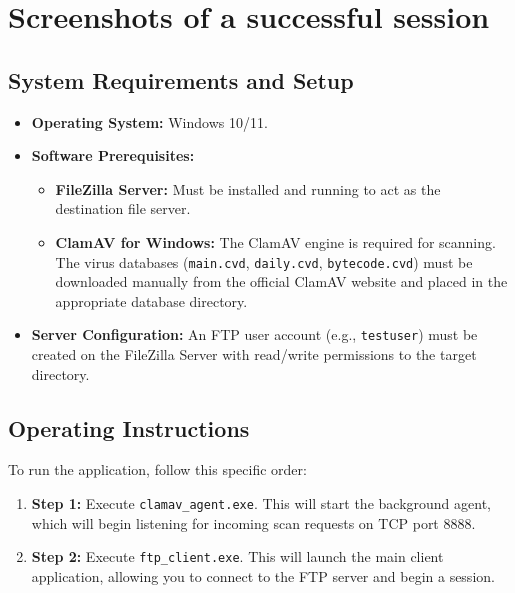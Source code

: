 \section{Screenshots of a successful session}
\subsection{System Requirements and Setup}
\begin{itemize}
    \item \textbf{Operating System:} Windows 10/11.
    \item \textbf{Software Prerequisites:}
    \begin{itemize}
        \item \textbf{FileZilla Server:} Must be installed and running to act as the destination file server.
        \item \textbf{ClamAV for Windows:} The ClamAV engine is required for scanning. The virus databases (\texttt{main.cvd}, \texttt{daily.cvd}, \texttt{bytecode.cvd}) must be downloaded manually from the official ClamAV website and placed in the appropriate database directory.
    \end{itemize}
    \item \textbf{Server Configuration:} An FTP user account (e.g., \texttt{testuser}) must be created on the FileZilla Server with read/write permissions to the target directory.
\end{itemize}

\subsection{Operating Instructions}
To run the application, follow this specific order:
\begin{enumerate}
    \item \textbf{Step 1:} Execute \texttt{clamav\_agent.exe}. This will start the background agent, which will begin listening for incoming scan requests on TCP port 8888.
    \item \textbf{Step 2:} Execute \texttt{ftp\_client.exe}. This will launch the main client application, allowing you to connect to the FTP server and begin a session.
\end{enumerate}

